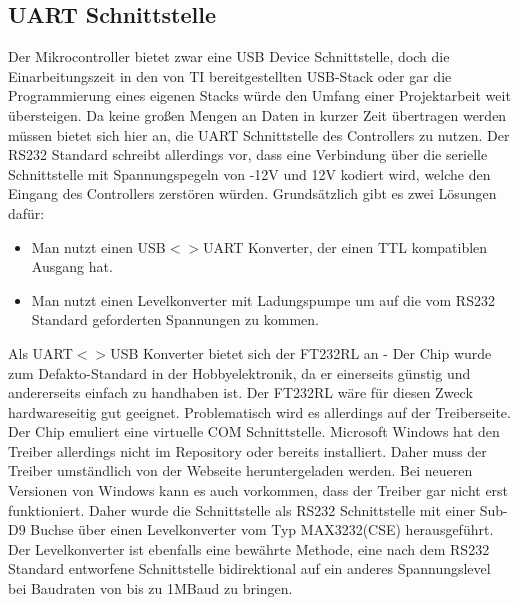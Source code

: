 \documentclass{scrartcl}
\begin{document}
 \subsection{UART Schnittstelle}
 Der Mikrocontroller bietet zwar eine USB Device Schnittstelle, doch die Einarbeitungszeit in den von TI bereitgestellten USB-Stack oder gar die Programmierung eines eigenen Stacks würde den Umfang einer Projektarbeit weit übersteigen. Da keine großen Mengen an Daten in kurzer Zeit übertragen werden müssen bietet sich hier an, die UART Schnittstelle des Controllers zu nutzen. Der RS232 Standard schreibt allerdings vor, dass eine Verbindung über die serielle Schnittstelle mit Spannungspegeln von -12V und 12V kodiert wird, welche den Eingang des Controllers zerstören würden. Grundsätzlich gibt es zwei Lösungen dafür:
 \begin{itemize}
 \item{Man nutzt einen USB$<>$UART Konverter, der einen TTL kompatiblen Ausgang hat.}
 \item{Man nutzt einen Levelkonverter mit Ladungspumpe um auf die vom RS232 Standard geforderten Spannungen zu kommen.}
 \end{itemize}
Als UART$<>$USB Konverter bietet sich der FT232RL an - Der Chip wurde zum Defakto-Standard in der Hobbyelektronik, da er einerseits günstig und andererseits einfach zu handhaben ist. Der FT232RL wäre für diesen Zweck hardwareseitig gut geeignet. Problematisch wird es allerdings auf der Treiberseite. Der Chip emuliert eine virtuelle COM Schnittstelle. Microsoft Windows hat den Treiber allerdings nicht im Repository oder bereits installiert. Daher muss der Treiber umständlich von der Webseite heruntergeladen werden. Bei neueren Versionen von Windows kann es auch vorkommen, dass der Treiber gar nicht erst funktioniert. 
Daher wurde die Schnittstelle als RS232 Schnittstelle mit einer Sub-D9 Buchse über einen Levelkonverter vom Typ MAX3232(CSE) herausgeführt. Der Levelkonverter ist ebenfalls eine bewährte Methode, eine nach dem RS232 Standard entworfene Schnittstelle bidirektional auf ein anderes Spannungslevel bei Baudraten von bis zu 1MBaud zu bringen.
 
\end{document}

